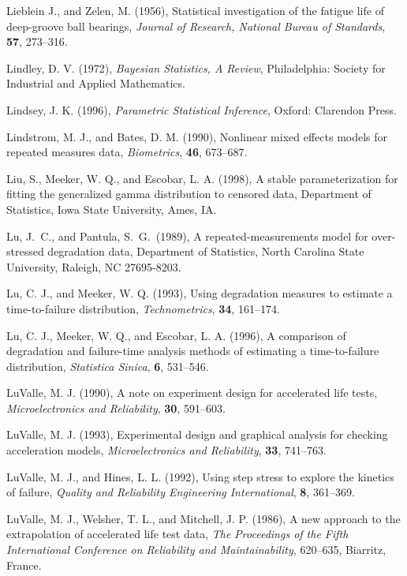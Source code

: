 \begin{thebibliography}{999}
Lieblein J., and Zelen, M. (1956), Statistical investigation of the
fatigue life of deep-groove ball bearings, {\em Journal of Research,
National Bureau of Standards}, {\bf 57}, 273--316.

Lindley, D. V. (1972), {\em Bayesian Statistics, A Review},
Philadelphia: Society for Industrial and Applied Mathematics.

Lindsey, J. K. (1996), {\em Parametric Statistical Inference},
Oxford: Clarendon Press.

Lindstrom, M. J., and Bates, D. M. (1990), Nonlinear mixed effects
models for repeated measures data, {\em Biometrics}, {\bf 46},
673--687.

Liu, S., Meeker, W. Q., and Escobar, L. A. (1998), A stable
parameterization for fitting the generalized gamma distribution to
censored data,  Department of Statistics, Iowa State University,
Ames, IA.

Lu, J.\ C., and Pantula, S.\ G.\ (1989), A repeated-measurements
model for over-stressed degradation data, Department of Statistics,
North Carolina State University, Raleigh, NC  27695-8203.

Lu, C. J., and Meeker, W. Q. (1993), Using degradation measures to
estimate a time-to-failure distribution, {\em Technometrics}, {\bf
34}, 161--174.

Lu, C. J., Meeker, W. Q., and Escobar, L. A. (1996), A comparison of
degradation and failure-time analysis methods of estimating a
time-to-failure distribution,  {\em Statistica Sinica}, {\bf 6},
531--546.

LuValle, M. J. (1990), A note on experiment design for accelerated
life tests, {\em Microelectronics and Reliability}, {\bf 30}, 591--603.

LuValle, M. J. (1993), Experimental design and graphical analysis
for checking acceleration models, {\em Microelectronics and
Reliability}, {\bf 33}, 741--763.

LuValle, M. J., and Hines, L. L. (1992), Using step stress to
explore the kinetics of failure, {\em Quality and Reliability
Engineering International}, {\bf 8}, 361--369.

LuValle, M. J., Welsher, T. L., and Mitchell, J. P. (1986),
A new approach to the extrapolation of accelerated
life test data, {\em The Proceedings of the Fifth International
Conference on Reliability and Maintainability}, 620--635,
Biarritz, France.


\end{thebibliography}
